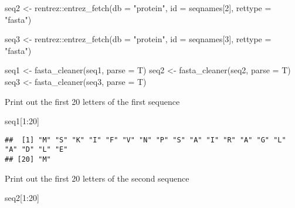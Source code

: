 \documentclass[
]{book}
\newenvironment{Shaded}{\begin{snugshade}}{\end{snugshade}}
\newcommand{\AttributeTok}[1]{\textcolor[rgb]{0.77,0.63,0.00}{#1}}
\newcommand{\DecValTok}[1]{\textcolor[rgb]{0.00,0.00,0.81}{#1}}
\newcommand{\FunctionTok}[1]{\textcolor[rgb]{0.00,0.00,0.00}{#1}}
\newcommand{\NormalTok}[1]{#1}
\newcommand{\OtherTok}[1]{\textcolor[rgb]{0.56,0.35,0.01}{#1}}
\newcommand{\SpecialCharTok}[1]{\textcolor[rgb]{0.00,0.00,0.00}{#1}}
\newcommand{\StringTok}[1]{\textcolor[rgb]{0.31,0.60,0.02}{#1}}
\begin{document}
\begin{Shaded}
\begin{Highlighting}[]
\NormalTok{seq2 }\OtherTok{\textless{}{-}}\NormalTok{ rentrez}\SpecialCharTok{::}\FunctionTok{entrez\_fetch}\NormalTok{(}\AttributeTok{db =} \StringTok{"protein"}\NormalTok{, }
                          \AttributeTok{id =}\NormalTok{ seqnames[}\DecValTok{2}\NormalTok{], }
                          \AttributeTok{rettype =} \StringTok{"fasta"}\NormalTok{) }

\NormalTok{seq3 }\OtherTok{\textless{}{-}}\NormalTok{ rentrez}\SpecialCharTok{::}\FunctionTok{entrez\_fetch}\NormalTok{(}\AttributeTok{db =} \StringTok{"protein"}\NormalTok{, }
                          \AttributeTok{id =}\NormalTok{ seqnames[}\DecValTok{3}\NormalTok{], }
                          \AttributeTok{rettype =} \StringTok{"fasta"}\NormalTok{)}
\end{Highlighting}
\end{Shaded}

\begin{Shaded}
\begin{Highlighting}[]
\NormalTok{seq1 }\OtherTok{\textless{}{-}} \FunctionTok{fasta\_cleaner}\NormalTok{(seq1, }\AttributeTok{parse =}\NormalTok{ T)  }
\NormalTok{seq2 }\OtherTok{\textless{}{-}} \FunctionTok{fasta\_cleaner}\NormalTok{(seq2, }\AttributeTok{parse =}\NormalTok{ T)  }
\NormalTok{seq3 }\OtherTok{\textless{}{-}} \FunctionTok{fasta\_cleaner}\NormalTok{(seq3, }\AttributeTok{parse =}\NormalTok{ T)  }
\end{Highlighting}
\end{Shaded}

Print out the first 20 letters of the first sequence

\begin{Shaded}
\begin{Highlighting}[]
\NormalTok{seq1[}\DecValTok{1}\SpecialCharTok{:}\DecValTok{20}\NormalTok{]                                   }
\end{Highlighting}
\end{Shaded}

\begin{verbatim}
##  [1] "M" "S" "K" "I" "F" "V" "N" "P" "S" "A" "I" "R" "A" "G" "L" "A" "D" "L" "E"
## [20] "M"
\end{verbatim}

Print out the first 20 letters of the second sequence

\begin{Shaded}
\begin{Highlighting}[]
\NormalTok{seq2[}\DecValTok{1}\SpecialCharTok{:}\DecValTok{20}\NormalTok{]                                   }
\end{Highlighting}
\end{Shaded}
\end{document}
